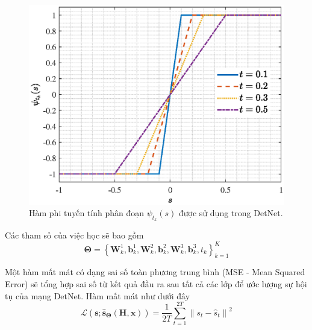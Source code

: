 \begin{figure}[ht]
    \centering
    \includegraphics[width=.8\linewidth]{figures/soft_sign.eps}
    \caption{Hàm phi tuyến tính phân đoạn $\psi_{t_k}(s)$ được sử dụng trong DetNet.}
    \label{fig:soft_sign}
\end{figure}
Các tham số của việc học sẽ bao gồm 
\begin{equation}
\boldsymbol{\Theta}=\left\{\mathbf{W}^1_{k}, \mathbf{b}^1_{k}, \mathbf{W}^2_{k}, \mathbf{b}^2_{k}, \mathbf{W}^3_{k}, \mathbf{b}^3_{ k}, t_k\right\}_{k=1}^K
\end{equation}

Một hàm mất mát có dạng sai số toàn phương trung bình (MSE - Mean Squared Error) sẽ tổng hợp sai số từ kết quả đầu ra sau tất cả các lớp để ước lượng sự hội tụ của mạng DetNet. Hàm mất mát như dưới đây
\begin{equation}
\label{eq:lossdetnet}
    \mathcal{L}(\mathbf{s} ; \hat{\mathbf{s}}_{\boldsymbol{\Theta}}(\mathbf{H}, \mathbf{x}))= \frac{1}{2T} \sum_{t=1}^{2T} {\left\| s_t-\hat{s}_t\right\|^2}
\end{equation}


